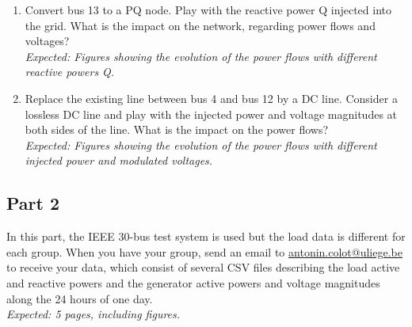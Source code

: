 \documentclass[11pt,a4paper]{article}
\begin{document}
\begin{enumerate}
    \item Convert bus 13 to a PQ node. Play with the reactive power Q injected into the grid. What is the impact on the network, regarding power flows and voltages?\\
    \textit{Expected: Figures showing the evolution of the power flows with different reactive powers Q.}
    
    \item Replace the existing line between bus 4 and bus 12 by a DC line. Consider a lossless DC line and play with the injected power and voltage magnitudes at both sides of the line. What is the impact on the power flows?\\
    \textit{Expected: Figures showing the evolution of the power flows with different injected power and modulated voltages.}
    
\end{enumerate}

\subsection{Part 2}
In this part, the IEEE 30-bus test system is used but the load data is different for each group. When you have your group, send an email to \url{antonin.colot@uliege.be} to receive your data, which consist of several CSV files describing the load active and reactive powers and the generator active powers and voltage magnitudes along the 24 hours of one day.\\
\textit{Expected: 5 pages, including figures.}
\end{document}
